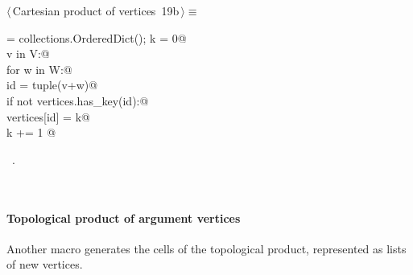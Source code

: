 \documentclass[11pt,oneside]{article}	%
\begin{document}
\begin{flushleft} \small
\begin{minipage}{\linewidth} \label{scrap27}
\protect{}$\langle\,$Cartesian product of vertices\nobreak\ {\footnotesize 19b}$\,\rangle\equiv$
\vspace{-1ex}
\begin{list}{}{} \item
\mbox{}\verb@vertices = collections.OrderedDict(); k = 0@\\
\mbox{}\verb@for v in V:@\\
\mbox{}\verb@    for w in W:@\\
\mbox{}\verb@        id = tuple(v+w)@\\
\mbox{}\verb@        if not vertices.has_key(id):@\\
\mbox{}\verb@            vertices[id] = k@\\
\mbox{}\verb@            k += 1   @{\NWsep}
\end{list}
\vspace{-1ex}
\footnotesize\addtolength{\baselineskip}{-1ex}
\begin{list}{}{\setlength{\itemsep}{-\parsep}\setlength{\itemindent}{-\leftmargin}}
\item \NWtxtMacroRefIn\ .
\end{list}
\end{minipage}\\[4ex]
\end{flushleft}


\paragraph{Topological product of argument vertices}
Another macro generates the cells of the topological product, represented as lists of new vertices. 
\end{document}
